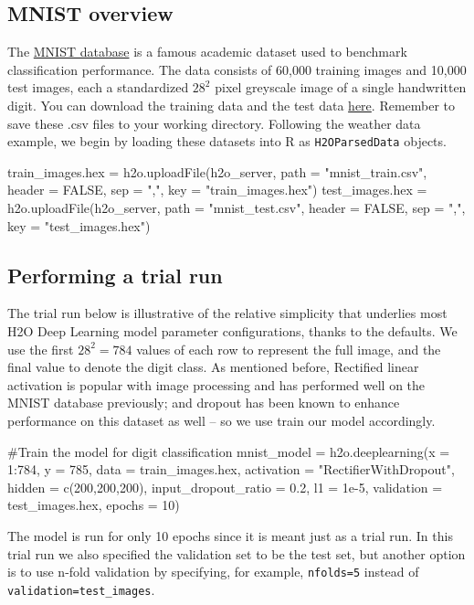 \documentclass[12pt]{article}
\begin{document}
\subsection{MNIST overview}

The \href{http://yann.lecun.com/exdb/mnist/}{MNIST database} is a famous academic dataset used to benchmark classification performance. The data consists of 60,000 training images and 10,000 test images, each a standardized $28^2$ pixel greyscale image of a single handwritten digit. You can download the training data and the test data \href{https://github.com/0xdata/h2o/tree/master/smalldata/mnist}{here}. Remember to save these .csv files to your working directory. Following the weather data example, we begin by loading these datasets into R as \texttt{H2OParsedData} objects. 

\begin{spverbatim}
train_images.hex = h2o.uploadFile(h2o_server, path = "mnist_train.csv", header = FALSE, sep = ",", key = "train_images.hex")
test_images.hex = h2o.uploadFile(h2o_server, path = "mnist_test.csv", header = FALSE, sep = ",", key = "test_images.hex")
\end{spverbatim}


\subsection{Performing a trial run}
The trial run below is illustrative of the relative simplicity that underlies most H2O Deep Learning model parameter configurations, thanks to the defaults. We use the first $28^2 = 784$ values of each row to represent the full image, and the final value to denote the digit class. As mentioned before, Rectified linear activation is popular with image processing and has performed well on the MNIST database previously; and dropout has been known to enhance performance on this dataset as well -- so we use train our model accordingly. 
\begin{spverbatim}

#Train the model for digit classification
mnist_model = h2o.deeplearning(x = 1:784, y = 785, data = train_images.hex, activation = "RectifierWithDropout", hidden = c(200,200,200), input_dropout_ratio = 0.2, l1 = 1e-5, validation = test_images.hex, epochs = 10)

\end{spverbatim}
\noindent
The model is run for only 10 epochs since it is meant just as a trial run. In this trial run we also specified the validation set to be the test set, but another option is to use n-fold validation by specifying, for example, \texttt{nfolds=5} instead of \texttt{validation=test\_images}. 
\end{document}
